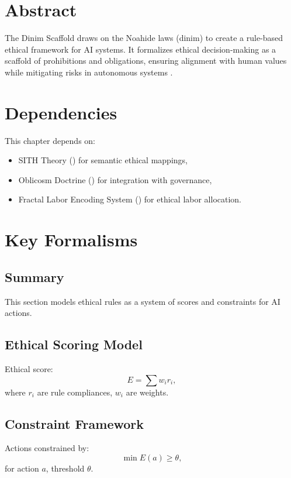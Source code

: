 \documentclass[11pt,oneside]{memoir}
\theoremstyle{plain}
\begin{document}
\section{Abstract}
The Dinim Scaffold draws on the Noahide laws (dinim) to create a rule-based ethical framework for AI systems. It formalizes ethical decision-making as a scaffold of prohibitions and obligations, ensuring alignment with human values while mitigating risks in autonomous systems \cite{ai_ethics, ai_ethics_framework}.

\section{Dependencies}
This chapter depends on:
\begin{itemize}
    \item SITH Theory () for semantic ethical mappings,
    \item Oblicosm Doctrine () for integration with governance,
    \item Fractal Labor Encoding System () for ethical labor allocation.
\end{itemize}

\section{Key Formalisms}
\subsection{Summary}
This section models ethical rules as a system of scores and constraints for AI actions.

\subsection{Ethical Scoring Model}
Ethical score:
\begin{equation}
    E = \sum w_i r_i,
\end{equation}
where \(r_i\) are rule compliances, \(w_i\) are weights.

\subsection{Constraint Framework}
Actions constrained by:
\begin{equation}
    \min E(a) \geq \theta,
\end{equation}
for action \(a\), threshold \(\theta\).
\end{document}

